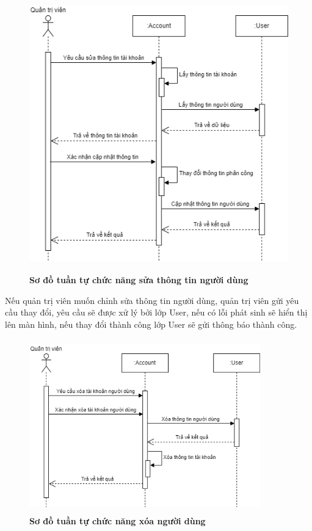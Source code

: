 \begin{figure}[H]
  \centering
  \includegraphics[width=12cm,height=12cm]{Images/sequence/sequence_manage_edit_user.png}
  \caption[Sơ đồ tuần tự chức năng sửa thông tin người dùng]{\bfseries \fontsize{12pt}{0pt}
  \selectfont Sơ đồ tuần tự chức năng sửa thông tin người dùng}
  \label{sequence_manage_edit_user} %
\end{figure}
Nếu quản trị viên muốn chỉnh sửa thông tin người dùng, quản trị viên gửi yêu cầu thay đổi, yêu cầu sẽ được xử lý bởi lớp User, nếu có lỗi phát sinh sẽ hiển thị lên màn hình,
nếu thay đổi thành công lớp User sẽ gửi thông báo thành công. 
\begin{figure}[H]
  \centering
  \includegraphics[width=10cm,height=7.5cm]{Images/sequence/sequence_manage_delete_user.png}
  \caption[Sơ đồ tuần tự chức năng xóa người dùng]{\bfseries \fontsize{12pt}{0pt}
  \selectfont Sơ đồ tuần tự chức năng xóa người dùng}
  \label{sequence_manage_delete_user} %
\end{figure}
